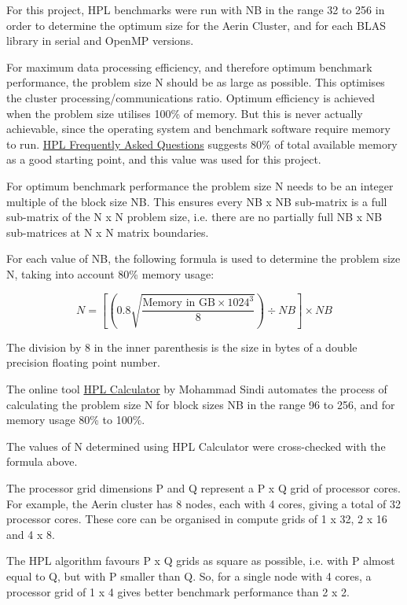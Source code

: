 For this project, HPL benchmarks were run with NB in the range 32 to 256 in order to determine the optimum size for the Aerin Cluster, and for each BLAS library in serial and OpenMP versions. 

For maximum data processing efficiency, and therefore optimum benchmark performance, the problem size N should be as large as possible. This optimises the cluster processing/communications ratio. Optimum efficiency is achieved when the problem size utilises 100\% of memory. But this is never actually achievable, since the operating system and benchmark software require memory to run. \href{https://www.netlib.org/benchmark/hpl/faqs.html}{HPL Frequently Asked Questions} suggests 80\% of total available memory as a good starting point, and this value was used for this project.

For optimum benchmark performance the problem size N needs to be an integer multiple of the block size NB. This ensures every NB x NB sub-matrix is a full sub-matrix of the N x N problem size, i.e. there are no partially full NB x NB sub-matrices at N x N matrix boundaries.

For each value of NB, the following formula is used to determine the problem size N, taking into account 80\% memory usage:

\[N = \left[\left(0.8 \sqrt{\frac{\text{Memory in GB} \times 1024^3}{8}}\right) \div NB\right] \times NB\]

The division by 8 in the inner parenthesis is the size in bytes of a double precision floating point number.


The online tool \href{http://hpl-calculator.sourceforge.net}{HPL Calculator} by Mohammad Sindi automates the process of calculating the problem size N for block sizes NB in the range 96 to 256, and for memory usage 80\% to 100\%.

The values of N determined using HPL Calculator were cross-checked with the formula above.

The processor grid dimensions P and Q represent a P x Q grid of processor cores. For example, the Aerin cluster has 8 nodes, each with 4 cores, giving a total of 32 processor cores. These core can be organised in compute grids of 1 x 32, 2 x 16 and 4 x 8.

The HPL algorithm favours P x Q grids as square as possible, i.e. with P almost equal to Q, but with P smaller than Q. So, for a single node with 4 cores, a processor grid of 1 x 4 gives better benchmark performance than 2 x 2.

